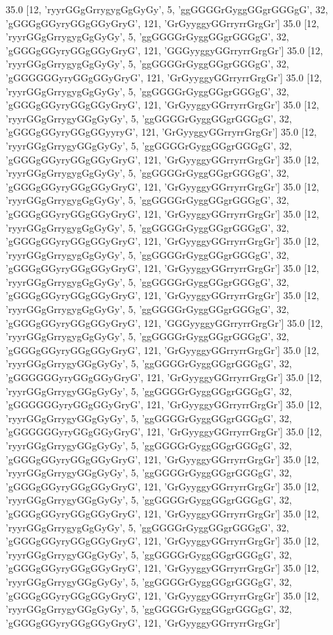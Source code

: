 35.0 [12, 'ryyrGGgGrrygygGgGyGy', 5, 'ggGGGGrGyggGGgrGGGgG', 32, 'gGGGgGGyryGGgGGyGryG', 121, 'GrGyyggyGGrryrrGrgGr']
35.0 [12, 'ryyrGGgGrrygygGgGyGy', 5, 'ggGGGGrGyggGGgrGGGgG', 32, 'gGGGgGGyryGGgGGyGryG', 121, 'GGGyyggyGGrryrrGrgGr']
35.0 [12, 'ryyrGGgGrrygygGgGyGy', 5, 'ggGGGGrGyggGGgrGGGgG', 32, 'gGGGGGGyryGGgGGyGryG', 121, 'GrGyyggyGGrryrrGrgGr']
35.0 [12, 'ryyrGGgGrrygygGgGyGy', 5, 'ggGGGGrGyggGGgrGGGgG', 32, 'gGGGgGGyryGGgGGyGryG', 121, 'GrGyyggyGGrryrrGrgGr']
35.0 [12, 'ryyrGGgGrrygyGGgGyGy', 5, 'ggGGGGrGyggGGgrGGGgG', 32, 'gGGGgGGyryGGgGGyyryG', 121, 'GrGyyggyGGrryrrGrgGr']
35.0 [12, 'ryyrGGgGrrygyGGgGyGy', 5, 'ggGGGGrGyggGGgrGGGgG', 32, 'gGGGgGGyryGGgGGyGryG', 121, 'GrGyyggyGGrryrrGrgGr']
35.0 [12, 'ryyrGGgGrrygygGgGyGy', 5, 'ggGGGGrGyggGGgrGGGgG', 32, 'gGGGgGGyryGGgGGyGryG', 121, 'GrGyyggyGGrryrrGrgGr']
35.0 [12, 'ryyrGGgGrrygygGgGyGy', 5, 'ggGGGGrGyggGGgrGGGgG', 32, 'gGGGgGGyryGGgGGyGryG', 121, 'GrGyyggyGGrryrrGrgGr']
35.0 [12, 'ryyrGGgGrrygygGgGyGy', 5, 'ggGGGGrGyggGGgrGGGgG', 32, 'gGGGgGGyryGGgGGyGryG', 121, 'GrGyyggyGGrryrrGrgGr']
35.0 [12, 'ryyrGGgGrrygygGgGyGy', 5, 'ggGGGGrGyggGGgrGGGgG', 32, 'gGGGgGGyryGGgGGyGryG', 121, 'GrGyyggyGGrryrrGrgGr']
35.0 [12, 'ryyrGGgGrrygygGgGyGy', 5, 'ggGGGGrGyggGGgrGGGgG', 32, 'gGGGgGGyryGGgGGyGryG', 121, 'GrGyyggyGGrryrrGrgGr']
35.0 [12, 'ryyrGGgGrrygygGgGyGy', 5, 'ggGGGGrGyggGGgrGGGgG', 32, 'gGGGgGGyryGGgGGyGryG', 121, 'GGGyyggyGGrryrrGrgGr']
35.0 [12, 'ryyrGGgGrrygygGgGyGy', 5, 'ggGGGGrGyggGGgrGGGgG', 32, 'gGGGgGGyryGGgGGyGryG', 121, 'GrGyyggyGGrryrrGrgGr']
35.0 [12, 'ryyrGGgGrrygyGGgGyGy', 5, 'ggGGGGrGyggGGgrGGGgG', 32, 'gGGGGGGyryGGgGGyGryG', 121, 'GrGyyggyGGrryrrGrgGr']
35.0 [12, 'ryyrGGgGrrygyGGgGyGy', 5, 'ggGGGGrGyggGGgrGGGgG', 32, 'gGGGGGGyryGGgGGyGryG', 121, 'GrGyyggyGGrryrrGrgGr']
35.0 [12, 'ryyrGGgGrrygyGGgGyGy', 5, 'ggGGGGrGyggGGgrGGGgG', 32, 'gGGGGGGyryGGgGGyGryG', 121, 'GrGyyggyGGrryrrGrgGr']
35.0 [12, 'ryyrGGgGrrygyGGgGyGy', 5, 'ggGGGGrGyggGGgrGGGgG', 32, 'gGGGgGGyryGGgGGyGryG', 121, 'GrGyyggyGGrryrrGrgGr']
35.0 [12, 'ryyrGGgGrrygyGGgGyGy', 5, 'ggGGGGrGyggGGgrGGGgG', 32, 'gGGGgGGyryGGgGGyGryG', 121, 'GrGyyggyGGrryrrGrgGr']
35.0 [12, 'ryyrGGgGrrygyGGgGyGy', 5, 'ggGGGGrGyggGGgrGGGgG', 32, 'gGGGgGGyryGGgGGyGryG', 121, 'GrGyyggyGGrryrrGrgGr']
35.0 [12, 'ryyrGGgGrrygygGgGyGy', 5, 'ggGGGGrGyggGGgrGGGgG', 32, 'gGGGgGGyryGGgGGyGryG', 121, 'GrGyyggyGGrryrrGrgGr']
35.0 [12, 'ryyrGGgGrrygyGGgGyGy', 5, 'ggGGGGrGyggGGgrGGGgG', 32, 'gGGGgGGyryGGgGGyGryG', 121, 'GrGyyggyGGrryrrGrgGr']
35.0 [12, 'ryyrGGgGrrygyGGgGyGy', 5, 'ggGGGGrGyggGGgrGGGgG', 32, 'gGGGgGGyryGGgGGyGryG', 121, 'GrGyyggyGGrryrrGrgGr']
35.0 [12, 'ryyrGGgGrrygyGGgGyGy', 5, 'ggGGGGrGyggGGgrGGGgG', 32, 'gGGGgGGyryGGgGGyGryG', 121, 'GrGyyggyGGrryrrGrgGr']
